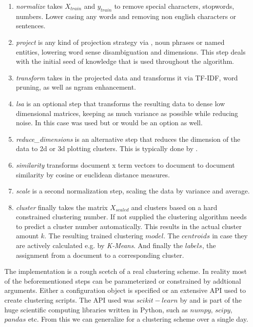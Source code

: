     \begin{enumerate}
      \item \emph{normalize} takes $X_{train}$ and $y_{train}$ to remove special characters, stopwords, numbers. Lower casing any words and removing non english characters or sentences. 
      \item \emph{project} is any kind of projection strategy via \wordnet{}, noun phrases or named entities, lowering word sense disambiguation and dimensions. This step deals with the initial seed of knowledge that is used throughout the algorithm.
      \item \emph{transform} takes in the projected data and transforms it via TF-IDF, word pruning, as well as ngram enhancement.
      \item \emph{lsa} is an optional step that transforms the resulting data to dense low dimensional matrices, keeping as much variance as possible while reducing noise. In this case \lsa{} was used but \lda{} or \hdp{} would be an option as well. 
      \item \emph{reduce\_dimensions} is an alternative step that reduces the dimension of the data to 2d or 3d plotting clusters. This is typically done by \pca{}.
      \item \emph{similarity} transforms document x term vectors to document to document similarity by cosine or euclidean distance measures.
      \item \emph{scale} is a second normalization step, scaling the data by variance and average.
      \item \emph{cluster} finally takes the matrix $X_{scaled}$ and clusters based on a hard constrained clustering number. If not supplied the clustering algorithm needs to predict a cluster number automatically. This results in the actual cluster amount $k$. The resulting trained clustering $model$. The $centroids$ in case they are actively calculated e.g. by \emph{K-Means}. And finally the $labels$, the assignment from a document to a corresponding cluster.
    \end{enumerate}

  The implementation is a rough scetch of a real clustering scheme. In reality most of the beforementioned steps can be parameterized or constrained by addtional arguments. Either a configuration object is specified or an extensive API used to create clustering scripts. The API used was $scikit-learn$ by \cite{ScikitLearn} and is part of the huge scientific computing libraries written in Python, such as $numpy$, $scipy$, $pandas$ etc. From this we can generalize for a clustering scheme over a single day.

